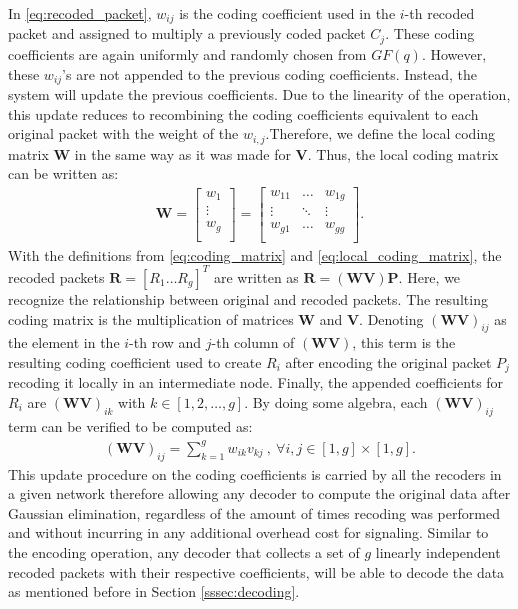 In \eqref{eq:recoded_packet}, $w_{ij}$ is the coding coefficient used
in the $i$-th recoded packet and assigned to multiply a previously
coded packet $C_j$. These coding coefficients are again uniformly and
randomly chosen from $GF(q)$. However, these $w_{ij}$'s are not
appended to the previous coding coefficients.  Instead, the system
will update the previous coefficients. Due to the linearity of the
operation, this update reduces to recombining the coding coefficients
equivalent to each original packet with the weight of the
$w_{i,j}$.Therefore, we define the local coding matrix $\textbf{W}$ in
the same way as it was made for $\textbf{V}$. Thus, the local coding
matrix can be written as:
%
\begin{align} \label{eq:local_coding_matrix}
\textbf{W} =
\left[
\begin{array}{c}
        w_1    \\ \hline
        \vdots \\ \hline
        w_g    \\
\end{array}
\right]
=
\left[
\begin{array}{ccc}
        w_{11} & \ldots & w_{1g} \\
        \vdots  & \ddots & \vdots  \\
        w_{g1} & \ldots & w_{gg} \\
\end{array}
\right].
\end{align}
%
With the definitions from \eqref{eq:coding_matrix} and
\eqref{eq:local_coding_matrix}, the recoded packets
$\textbf{R} = \left[R_1 \ldots R_g \right]^T$ are written as
$\textbf{R} = (\textbf{W} \textbf{V}) \textbf{P}$. Here, we recognize
the relationship between original and recoded packets. The resulting
coding matrix is the multiplication of matrices $\textbf{W}$ and
$\textbf{V}$. Denoting ${(\textbf{W} \textbf{V})}_{ij}$ as the element
in the $i$-th row and $j$-th column of $(\textbf{W} \textbf{V})$, this
term is the resulting coding coefficient used to create $R_i$ after
encoding the original packet $P_j$ recoding it locally in an intermediate
node. Finally, the appended coefficients for $R_i$ are
${(\textbf{W} \textbf{V})}_{ik}$ with $k \in [1,2,\ldots,g]$. By doing some
algebra, each ${(\textbf{W} \textbf{V})}_{ij}$ term can be verified to be
computed as:
%
\begin{align}
\label{eq:appended_coded_coefficients}
{(\textbf{W} \textbf{V})}_{ij} = \sum_{k=1}^{g} w_{ik} v_{kj}\ ,\ \forall i,j \in [1,g] \times [1,g].
\end{align}
%
This update procedure on the coding coefficients is carried by all the
recoders in a given network therefore allowing any decoder to compute
the original data after Gaussian elimination, regardless of the amount
of times recoding was performed and without incurring in any
additional overhead cost for signaling. Similar to the encoding
operation, any decoder that collects a set of $g$ linearly independent recoded
packets with their respective coefficients, will be able to decode the
data as mentioned before in Section \ref{sssec:decoding}.


